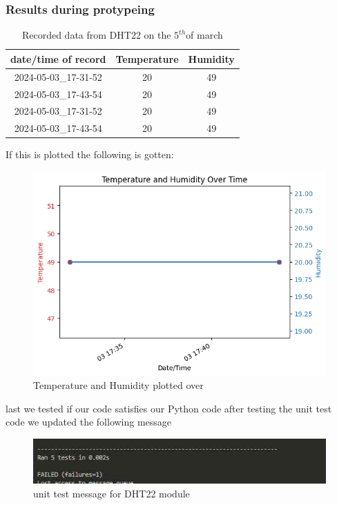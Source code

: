 \subsubsection{Results during protypeing}
\begin{table}[h!]
    \centering
    \begin{tabular}{|c|c|c|}
        \hline
        date/time of record & Temperature &Humidity \\
        \hline\hline
        2024-05-03\_17-31-52&20&49\\
        2024-05-03\_17-43-54&20&49\\
        2024-05-03\_17-31-52&20&49\\
        2024-05-03\_17-43-54&20&49\\
        \hline
    \end{tabular}
    \caption{Recorded data from  DHT22 on the $5^{th}$of march}
    \label{Recorded data from  DHT22 on the 5th of march}
\end{table}
If this is  plotted the following is gotten:
\begin{figure}[h!]
    \centering
    \includegraphics[width=0.5\linewidth]{Images/temp_and_humidity_over_time.png}
    \caption{Temperature and Humidity plotted over}
    \label{Temperature and Humidity plotted over}
\end{figure} 
last we tested if our code  satisfies our Python code after testing the unit test code we updated the following message
\begin{figure}[h!]
    \centering
    \includegraphics[width=0.5\linewidth]{Images/unit_testoutput.jpg}
    \caption{unit test message for DHT22 module}
    \label{unit test message for DHT22 module}
\end{figure}
\newpage
